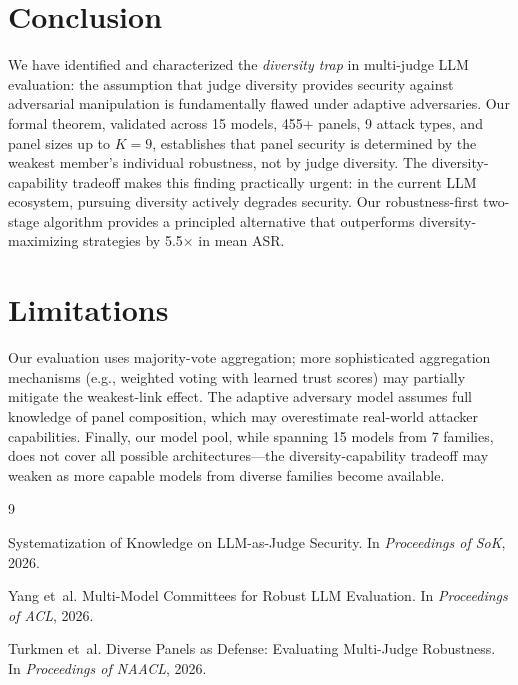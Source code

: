 \documentclass[11pt]{article}
\begin{document}
\section{Conclusion}

We have identified and characterized the \emph{diversity trap} in multi-judge LLM evaluation: the assumption that judge diversity provides security against adversarial manipulation is fundamentally flawed under adaptive adversaries. Our formal theorem, validated across 15 models, 455+ panels, 9 attack types, and panel sizes up to $K=9$, establishes that panel security is determined by the weakest member's individual robustness, not by judge diversity. The diversity-capability tradeoff makes this finding practically urgent: in the current LLM ecosystem, pursuing diversity actively degrades security. Our robustness-first two-stage algorithm provides a principled alternative that outperforms diversity-maximizing strategies by 5.5$\times$ in mean ASR.

\section*{Limitations}

Our evaluation uses majority-vote aggregation; more sophisticated aggregation mechanisms (e.g., weighted voting with learned trust scores) may partially mitigate the weakest-link effect. The adaptive adversary model assumes full knowledge of panel composition, which may overestimate real-world attacker capabilities. Finally, our model pool, while spanning 15 models from 7 families, does not cover all possible architectures---the diversity-capability tradeoff may weaken as more capable models from diverse families become available.


\begin{thebibliography}{9}

{Systematization of Knowledge on LLM-as-Judge Security.}
\newblock In \emph{Proceedings of SoK}, 2026.

Yang et~al.
\newblock Multi-Model Committees for Robust LLM Evaluation.
\newblock In \emph{Proceedings of ACL}, 2026.

Turkmen et~al.
\newblock Diverse Panels as Defense: Evaluating Multi-Judge Robustness.
\newblock In \emph{Proceedings of NAACL}, 2026.

\end{thebibliography}
\end{document}
